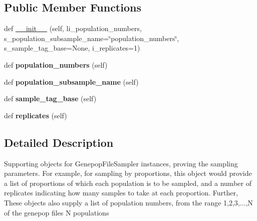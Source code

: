 \subsection*{Public Member Functions}
\begin{DoxyCompactItemize}
\item 
def \hyperlink{classnegui_1_1genepopfilesampler_1_1GenepopFileSampleParams_a97adc62099fe8f021d4baa948551b970}{\+\_\+\+\_\+init\+\_\+\+\_\+} (self, li\+\_\+population\+\_\+numbers, s\+\_\+population\+\_\+subsample\+\_\+name=\char`\"{}population\+\_\+numbers\char`\"{}, s\+\_\+sample\+\_\+tag\+\_\+base=None, i\+\_\+replicates=1)
\item 
def {\bfseries population\+\_\+numbers} (self)\hypertarget{classnegui_1_1genepopfilesampler_1_1GenepopFileSampleParams_a5ecc667eef35a832923e5c4ce659cfe7}{}\label{classnegui_1_1genepopfilesampler_1_1GenepopFileSampleParams_a5ecc667eef35a832923e5c4ce659cfe7}

\item 
def {\bfseries population\+\_\+subsample\+\_\+name} (self)\hypertarget{classnegui_1_1genepopfilesampler_1_1GenepopFileSampleParams_ab3ae1c545edd5230e6c37db9507d0535}{}\label{classnegui_1_1genepopfilesampler_1_1GenepopFileSampleParams_ab3ae1c545edd5230e6c37db9507d0535}

\item 
def {\bfseries sample\+\_\+tag\+\_\+base} (self)\hypertarget{classnegui_1_1genepopfilesampler_1_1GenepopFileSampleParams_a943ad5572fa9623ea33b940286df2e3a}{}\label{classnegui_1_1genepopfilesampler_1_1GenepopFileSampleParams_a943ad5572fa9623ea33b940286df2e3a}

\item 
def {\bfseries replicates} (self)\hypertarget{classnegui_1_1genepopfilesampler_1_1GenepopFileSampleParams_aca3ce40cd559719396e4cadec36dfbd1}{}\label{classnegui_1_1genepopfilesampler_1_1GenepopFileSampleParams_aca3ce40cd559719396e4cadec36dfbd1}

\end{DoxyCompactItemize}


\subsection{Detailed Description}
\begin{DoxyVerb}Supporting objects for GenepopFileSampler instances,
proving the sampling parameters.  For example, for 
sampling by proportions, this object would provide
a list of proportions of which each population is to 
be sampled, and a number of replicates indicating how
many samples to take at each proportion.  Further,
These objects also supply a list of population numbers,
from the range 1,2,3,...,N of the genepop files N
populations
\end{DoxyVerb}
 

